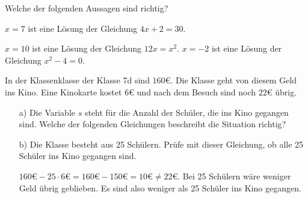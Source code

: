\documentclass{uebungsblatt}
\begin{document}
\begin{exercise}
    Welche der folgenden Aussagen sind richtig?
    \begin{multiplechoice}
        \citem $x=7$ ist eine Lösung der Gleichung $4x+2=30$.
        \item $x=10$ ist eine Lösung der Gleichung $12x=x^2$.
        \citem $x=-2$ ist eine Lösung der Gleichung $x^2-4=0$.
    \end{multiplechoice}
\end{exercise}

\begin{exercise}
    In der Klassenklasse der Klasse 7d sind $160\euro$. Die Klasse geht von diesem Geld ins Kino. 
    Eine Kinokarte kostet $6\euro$ und nach dem Besuch sind noch $22\euro$ übrig.
    \begin{enumerate}
        \item[a)] Die Variable $s$ steht für die Anzahl der Schüler, die ins Kino gegangen sind. Welche der folgenden Gleichungen beschreibt die Situation richtig?
        \begin{multicols}{3}
        \end{multicols} 
        \item[b)] Die Klasse besteht aus 25 Schülern. Prüfe mit dieser Gleichung, ob alle 25 Schüler ins Kino gegangen sind.
        \begin{answerbox}[.5in]
            $160\euro-25\cdot 6\euro=160\euro-150\euro=10\euro\neq 22\euro$. Bei 25 Schülern wäre weniger Geld übrig geblieben. Es sind also weniger als 25 Schüler ins Kino gegangen.
        \end{answerbox}
    \end{enumerate}
\end{exercise}

\end{document}
